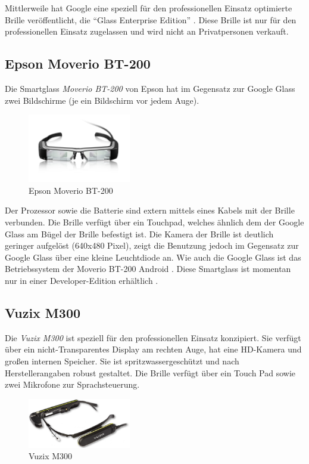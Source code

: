Mittlerweile hat Google eine speziell für den professionellen Einsatz optimierte Brille veröffentlicht, die \enquote{Glass Enterprise Edition} \cite{Inc.2018}. Diese Brille ist nur für den professionellen Einsatz zugelassen und wird nicht an Privatpersonen verkauft.
%
%
%
%
%
%
\subsection{Epson Moverio BT-200}
\label{sec:Epson_Moverio_BT-200}
Die Smartglass \emph{Moverio BT-200} von Epson hat im Gegensatz zur Google Glass zwei Bildschirme (je ein Bildschirm vor jedem Auge). 
%
\begin{figure}[htbp]
    \centering
    \includegraphics[width=0.4\textwidth]{data/bilder/Moverio_BT-200.png}
    \caption{Epson Moverio BT-200 \cite{Epson}}
    \label{fig:BT-200}
\end{figure}
%
Der Prozessor sowie die Batterie sind extern mittels eines Kabels mit der Brille verbunden. Die Brille verfügt über ein Touchpad, welches ähnlich dem der Google Glass am Bügel der Brille befestigt ist. Die Kamera der Brille ist deutlich geringer aufgelöst (640x480 Pixel), zeigt die Benutzung jedoch im Gegensatz zur Google Glass über eine kleine Leuchtdiode an. Wie auch die Google Glass ist das Betriebssystem der Moverio BT-200 Android \cite[S.~32]{Schwenke2016}. Diese Smartglass ist momentan nur in einer Developer-Edition erhältlich \cite{Epson}.
%
%
%
%
%
%
\subsection{Vuzix M300}
\label{sec:Vuzix_M300}
Die \emph{Vuzix M300} ist speziell für den professionellen Einsatz konzipiert. Sie verfügt über ein nicht-Transparentes Display am rechten Auge, hat eine HD-Kamera und großen internen Speicher. Sie ist spritzwassergeschützt und nach Herstellerangaben robust gestaltet. Die Brille verfügt über ein Touch Pad sowie zwei Mikrofone zur Sprachsteuerung. 
%
\begin{figure}[htbp]
    \centering
    \includegraphics[width=0.4\textwidth]{data/bilder/m300-top.png}
    \caption{Vuzix M300 \cite{Vuzix2018}}
    \label{fig:Vuzix_M300}
\end{figure}
%

